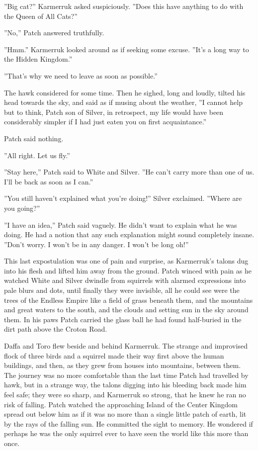 \documentclass[11pt]{article}
\begin{document}
 ''Big cat?'' Karmerruk asked suspiciously. ''Does this have anything to do with the Queen of All Cats?''\par
 ''No,'' Patch answered truthfully.\par
 ''Hmm.'' Karmerruk looked around as if seeking some excuse. ''It's a long way to the Hidden Kingdom.''\par
 ''That's why we need to leave as soon as possible.''\par
 The hawk considered for some time. Then he sighed, long and loudly, tilted his head towards the sky, and said as if musing about the weather, ''I cannot help but to think, Patch son of Silver, in retrospect, my life would have been considerably simpler if I had just eaten you on first acquaintance.''\par
 Patch said nothing.\par
 ''All right. Let us fly.''\par
 ''Stay here,'' Patch said to White and Silver. ''He can't carry more than one of us. I'll be back as soon as I can.''\par
 ''You still haven't explained what you're doing!'' Silver exclaimed. ''Where are you going?''\par
 ''I have an idea,'' Patch said vaguely. He didn't want to explain what he was doing. He had a notion that any such explanation might sound completely insane. ''Don't worry. I won't be in any danger. I won't be long %
 oh!''\par
 This last expostulation was one of pain and surprise, as Karmerruk's talons dug into his flesh and lifted him away from the ground. Patch winced with pain as he watched White and Silver dwindle from squirrels with alarmed expressions into pale blurs and dots, until finally they were invisible, all he could see were the trees of the Endless Empire like a field of grass beneath them, and the mountains and great waters to the south, and the clouds and setting sun in the sky around them. In his paws Patch carried the glass ball he had found half-buried in the dirt path above the Croton Road.\par
Daffa and Toro flew beside and behind Karmerruk. The strange and improvised flock of three birds and a squirrel made their way first above the human buildings, and then, as they grew from houses into mountains, between them. The journey was no more comfortable than the last time Patch had travelled by hawk, but in a strange way, the talons digging into his bleeding back made him feel safe; they were so sharp, and Karmerruk so strong, that he knew he ran no risk of falling. Patch watched the approaching Island of the Center Kingdom spread out below him as if it was no more than a single little patch of earth, lit by the rays of the falling sun. He committed the sight to memory. He wondered if perhaps he was the only squirrel ever to have seen the world like this more than once.\par
\end{document}
